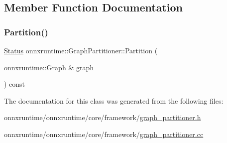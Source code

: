 \subsection{Member Function Documentation}
\mbox{\label{classonnxruntime_1_1GraphPartitioner_a7ac40b366c28fbb83c051f110e40a3ad}} 
\subsubsection{\texorpdfstring{Partition()}{Partition()}}
{\footnotesize\ttfamily \mbox{\hyperlink{classonnxruntime_1_1common_1_1Status}{Status}} onnxruntime\+::\+Graph\+Partitioner\+::\+Partition (\begin{DoxyParamCaption}\item[{\mbox{\hyperlink{classonnxruntime_1_1Graph}{onnxruntime\+::\+Graph}} \&}]{graph }\end{DoxyParamCaption}) const}



The documentation for this class was generated from the following files\+:\begin{DoxyCompactItemize}
\item 
onnxruntime/onnxruntime/core/framework/\mbox{\hyperlink{graph__partitioner_8h}{graph\+\_\+partitioner.\+h}}\item 
onnxruntime/onnxruntime/core/framework/\mbox{\hyperlink{graph__partitioner_8cc}{graph\+\_\+partitioner.\+cc}}\end{DoxyCompactItemize}
